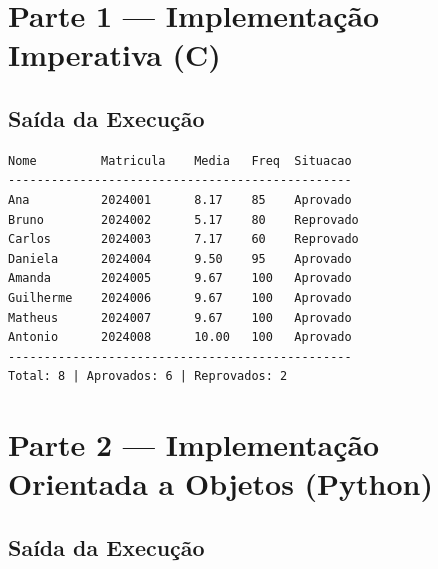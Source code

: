 \documentclass[12pt, a4paper]{article}
\begin{document}
\section{Parte 1 --- Implementação Imperativa (C)}



\subsection{Saída da Execução}

\begin{lstlisting}[style=output]
Nome         Matricula    Media   Freq  Situacao
------------------------------------------------
Ana          2024001      8.17    85    Aprovado
Bruno        2024002      5.17    80    Reprovado
Carlos       2024003      7.17    60    Reprovado
Daniela      2024004      9.50    95    Aprovado
Amanda       2024005      9.67    100   Aprovado
Guilherme    2024006      9.67    100   Aprovado
Matheus      2024007      9.67    100   Aprovado
Antonio      2024008      10.00   100   Aprovado
------------------------------------------------
Total: 8 | Aprovados: 6 | Reprovados: 2
\end{lstlisting}

\section{Parte 2 --- Implementação Orientada a Objetos (Python)}



\subsection{Saída da Execução}
\end{document}
